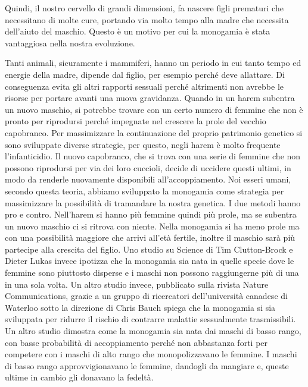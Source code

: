 \documentclass[12pt]{book} %
\begin{document}
Quindi, il nostro cervello di grandi dimensioni, fa nascere figli prematuri che necessitano di molte cure, portando via
molto tempo alla madre che necessita dell'aiuto del maschio. Questo è un motivo per cui la monogamia è stata vantaggiosa nella nostra evoluzione.

Tanti animali, sicuramente i mammiferi, hanno un periodo in cui tanto tempo ed energie della madre, dipende dal figlio, per esempio perché deve
allattare. Di conseguenza evita gli altri rapporti sessuali perché altrimenti non avrebbe le risorse per portare avanti una nuova gravidanza. Quando in un harem subentra un nuovo maschio, si potrebbe trovare con un certo numero
di femmine che non è pronto per riprodursi perché impegnate nel crescere la prole del vecchio capobranco. Per massimizzare
la continuazione del proprio patrimonio genetico si sono sviluppate diverse strategie, per questo, negli harem è molto
frequente l'infanticidio. Il nuovo capobranco, che si trova con una serie di femmine che non
possono riprodursi per via dei loro cuccioli, decide di uccidere questi ultimi, in modo da renderle nuovamente
disponibili all'accoppiamento. Noi esseri umani, secondo questa teoria, abbiamo
sviluppato la monogamia come strategia per massimizzare la possibilità di tramandare la nostra genetica. I due metodi
hanno pro e contro. Nell'harem si hanno più femmine quindi più prole, ma se subentra un nuovo
maschio ci si ritrova con niente. Nella monogamia si ha meno prole ma con una possibilità maggiore che arrivi
all'età fertile, inoltre il maschio sarà più partecipe alla crescita del figlio. Uno studio su
Science di Tim Clutton-Brock e Dieter Lukas invece ipotizza
che la monogamia sia nata in quelle specie dove le femmine sono piuttosto disperse e i maschi non possono raggiungerne
più di una in una sola volta. Un altro studio invece, pubblicato sulla rivista Nature Communications, grazie a un
gruppo di ricercatori dell'università canadese di Waterloo sotto la direzione di Chris Bauch
spiega che la monogamia si sia sviluppata per ridurre il rischio di contrarre malattie sessualmente
trasmissibili. Un altro studio dimostra come la monogamia sia
nata dai maschi di basso rango, con basse probabilità di accoppiamento perché non abbastanza forti per competere con i
maschi di alto rango che monopolizzavano le femmine. I maschi di basso rango approvvigionavano le femmine, dandogli da
mangiare e, queste ultime in cambio gli donavano la fedeltà.
\end{document}
